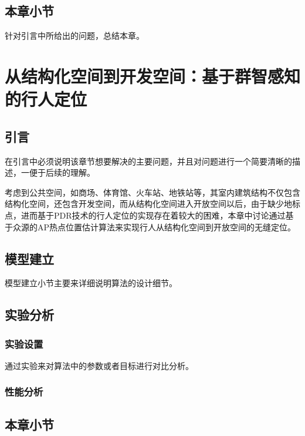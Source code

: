 \section{本章小节}

针对引言中所给出的问题，总结本章。




\chapter{从结构化空间到开发空间：基于群智感知的行人定位}

\section{引言}

在引言中必须说明该章节想要解决的主要问题，并且对问题进行一个简要清晰的描述，一便于后续的理解。

考虑到公共空间，如商场、体育馆、火车站、地铁站等，其室内建筑结构不仅包含结构化空间，还包含开发空间，而从结构化空间进入开放空间以后，由于缺少地标点，进而基于PDR技术的行人定位的实现存在着较大的困难，本章中讨论通过基于众源的AP热点位置估计算法来实现行人从结构化空间到开放空间的无缝定位。

\section{模型建立}

模型建立小节主要来详细说明算法的设计细节。

\section{实验分析}

\subsection{实验设置}
通过实验来对算法中的参数或者目标进行对比分析。

\subsection{性能分析}

\section{本章小节}

